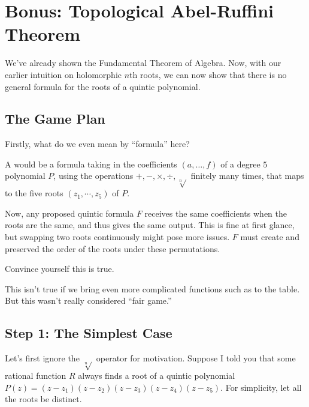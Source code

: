 \chapter{Bonus: Topological Abel-Ruffini Theorem}

We've already shown the Fundamental Theorem of Algebra.
Now, with our earlier intuition on holomorphic $n$th roots,
we can now show that there is no general formula for 
the roots of a quintic polynomial.

\section{The Game Plan}

Firstly, what do we even mean by ``formula'' here?

\begin{definition}
    A  would be a formula taking in the coefficients $(a, \dots, f)$ of a 
    degree $5$ polynomial $P$, using the operations $+, -, \times, \div, \sqrt[n]{}$ 
    finitely many times, that maps to the five roots $(z_1, \cdots, z_5)$ of $P$.
\end{definition}

Now, any proposed quintic formula $F$ receives the same coefficients when the roots are the same,
and thus gives the same output. This is fine at first glance, but swapping two roots continuously 
might pose more issues. $F$ must create and preserved the order of the roots under these permutations.

\begin{ques}
    Convince yourself this is true.
\end{ques}

\begin{remark}
    This isn't true if we bring even more complicated functions 
    such as  to the table. 
    But this wasn't really considered ``fair game.''
\end{remark}

\section{Step 1: The Simplest Case}

Let's first ignore the $\sqrt[n]{}$ operator for motivation.
Suppose I told you that some rational function $R$ always finds 
a root of a quintic polynomial $P(z) = (z - z_1)(z - z_2)(z - z_3)(z - z_4)(z - z_5)$.
For simplicity, let all the roots be distinct.

